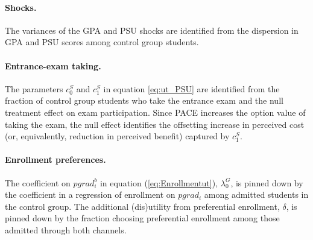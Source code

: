 \paragraph{Shocks.} The variances of the GPA and PSU shocks are identified from the dispersion in GPA and PSU scores among control group students.\par 




\paragraph{Entrance-exam taking.} The parameters $c_0^S$ and $c_1^S$ in equation \eqref{eq:ut_PSU} are identified from the fraction of control group students who take the entrance exam and the null treatment effect on exam participation. Since PACE increases the option value of taking the exam, the null effect identifies the offsetting increase in perceived cost (or, equivalently, reduction in perceived benefit) captured by $c_1^S$.\par 


\paragraph{Enrollment preferences.} The coefficient on $pgrad_i^b$ in equation (\ref{eq:Enrollmentut}), $\lambda_0^G$, is pinned down by the coefficient in a regression of enrollment on $pgrad_i$ among admitted students in the control group. The additional (dis)utility from preferential enrollment, $\delta$, is pinned down by the fraction choosing preferential enrollment among those admitted through both channels. \par








